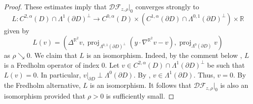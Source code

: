 \documentclass[11pt]{amsart}
\begin{document}
\begin{proof}
These estimates imply that $\mathcal{D}\mathcal{F}_{z,\rho}|_{0}$ 	converges  strongly to
	$$
	L:C^{2,\alpha}(D)\cap \Lambda^1(\partial D)^\perp \to C^{0,\alpha}(D)\times \left(  C^{1,\alpha}(\partial D)\cap \Lambda^{0,1}(\partial D)^\perp\right) \times \mathbb{R}
	$$
 	given by 
	$$
	L(v)=\left(\Delta^{\mathbb{R}^2} v,\operatorname{proj}_{\Lambda^{0,1}(\partial D)^\perp}(y\cdot \nabla^{\mathbb{R}^2}v-v),\operatorname{proj}_{\Lambda^0(\partial D)}v\right)
	$$
	as $\rho\searrow 0$.
We claim that $L$ is an isomorphism. Indeed, by the comment below \cite[Theorem 6.31]{GilbargTrudinger}, $L$ is a Fredholm operator of index $0$. Let $v\in C^{2,\alpha}(D)\cap \Lambda^1(\partial  D)^\perp$ be such that $L(v)=0$. In particular, $v|_{\partial D}\perp \Lambda^0(\partial D)$.  By \cite[Example 1.3.1]{Spectralgeometry}, 
 $v\in \Lambda^1(\partial D)$. Thus, $v=0$.   By the Fredholm alternative, $L$ is an isomorphism. It follows that  $\mathcal{D}\mathcal{F}_{z,\rho}|_{0}$ is also an isomorphism provided that $\rho>0$ is sufficiently small. 
	
\end{proof}
\end{document}
